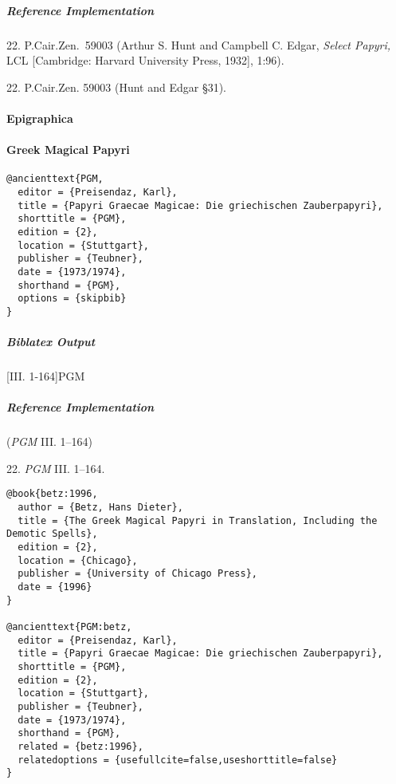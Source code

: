 \documentclass[a4paper]{article}
\newenvironment{biboutput}{%
  \subparagraph{Biblatex Output}
}{\color{black}}
\newenvironment{refimp}{%
  \subparagraph{Reference Implementation}
  \color{reference-colour}
  \rm
}{\par\color{black}}
\begin{document}
\begin{refimp}
  \hspace*{\bibindent}22. P.Cair.Zen.\ 59003 (Arthur S. Hunt and Campbell C.
  Edgar, \emph{Select Papyri,} LCL [Cambridge: Harvard University Press,
  1932], 1:96).

  \hspace*{\bibindent}22. P.Cair.Zen. 59003 (Hunt and Edgar §31).

\end{refimp}

\paragraph{Epigraphica}

\paragraph{Greek Magical Papyri}

\begin{lstlisting}
@ancienttext{PGM,
  editor = {Preisendaz, Karl},
  title = {Papyri Graecae Magicae: Die griechischen Zauberpapyri},
  shorttitle = {PGM},
  edition = {2},
  location = {Stuttgart},
  publisher = {Teubner},
  date = {1973/1974},
  shorthand = {PGM},
  options = {skipbib}
}
\end{lstlisting}

\begin{biboutput}
  [III. 1-164]{PGM}
\end{biboutput}

\begin{refimp}
  (\emph{PGM} III. 1–164)

  \hspace*{\bibindent}22. \emph{PGM} III. 1–164.

\end{refimp}

\medskip

\begin{lstlisting}
@book{betz:1996,
  author = {Betz, Hans Dieter},
  title = {The Greek Magical Papyri in Translation, Including the Demotic Spells},
  edition = {2},
  location = {Chicago},
  publisher = {University of Chicago Press},
  date = {1996}
}

@ancienttext{PGM:betz,
  editor = {Preisendaz, Karl},
  title = {Papyri Graecae Magicae: Die griechischen Zauberpapyri},
  shorttitle = {PGM},
  edition = {2},
  location = {Stuttgart},
  publisher = {Teubner},
  date = {1973/1974},
  shorthand = {PGM},
  related = {betz:1996},
  relatedoptions = {usefullcite=false,useshorttitle=false}
}
\end{lstlisting}
\end{document}
